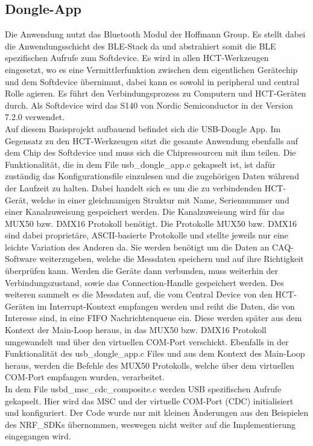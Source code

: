 \subsection{Dongle-App}
Die Anwendung nutzt das Bluetooth Modul der Hoffmann Group. Es stellt dabei die Anwendungsschicht des \ac{BLE}-Stack da und abstrahiert somit die \ac{BLE} spezifischen Aufrufe zum Softdevice. Es wird in allen \ac{HCT}-Werkzeugen eingesetzt, wo es eine Vermittlerfunktion zwischen dem eigentlichen Gerätechip und dem Softdevice übernimmt, dabei kann es sowohl in peripheral und central Rolle agieren. Es führt den Verbindungsprozess zu Computern und \ac{HCT}-Geräten durch. Als Softdevice wird das S140 von Nordic Semiconductor in der Version 7.2.0 verwendet. \\
Auf diesem Basisprojekt aufbauend befindet sich die \ac{USB}-Dongle App. Im Gegensatz zu den \ac{HCT}-Werkzeugen sitzt die gesamte Anwendung ebenfalls auf dem Chip des Softdevice und muss sich die Chipressourcen mit ihm teilen. Die Funktionalität, die in dem File usb\_dongle\_app.c gekapselt ist, ist dafür zuständig das Konfigurationsfile einzulesen und die zugehörigen Daten während der Laufzeit zu halten. Dabei handelt sich es um die zu verbindenden \ac{HCT}-Gerät, welche in einer gleichnamigen Struktur mit Name, Seriennummer und einer Kanalzuweisung gespeichert werden. Die Kanalzuweisung wird für das MUX50 bzw. DMX16 Protokoll benötigt. Die Protokolle MUX50 bzw. DMX16 sind dabei proprietäre, \ac{ASCII}-basierte Protokolle und stellte jeweils nur eine leichte Variation des Anderen da. Sie werden benötigt um die Daten an \ac{CAQ}-Software weiterzugeben, welche die Messdaten speichern und auf ihre Richtigkeit überprüfen kann. Werden die Geräte dann verbunden, muss weiterhin der Verbindungszustand, sowie das Connection-Handle gespeichert werden. Des weiteren sammelt es die Messdaten auf, die vom Central Device von den \ac{HCT}-Geräten im Interrupt-Kontext empfangen werden und reiht die Daten, die von Interesse sind, in eine \ac{FIFO} Nachrichtenqueue ein. Diese werden später aus dem Kontext der Main-Loop heraus, in das MUX50 bzw. DMX16 Protokoll umgewandelt und über den virtuellen COM-Port verschickt. Ebenfalls in der Funktionalität des usb\_dongle\_app.c Files und aus dem Kontext des Main-Loop heraus, werden die Befehle des MUX50 Protokolls, welche über dem virtuellen COM-Port empfangen wurden, verarbeitet.\\
In dem File usbd\_msc\_cdc\_composite.c werden \ac{USB} spezifischen Aufrufe gekapselt. Hier wird das \ac{MSC} und der virtuelle COM-Port (\ac{CDC}) initialisiert und konfiguriert. Der Code wurde nur mit kleinen Änderungen aus den Beispielen des NRF\_SDKs übernommen, weswegen nicht weiter auf die Implementierung eingegangen wird.\\
